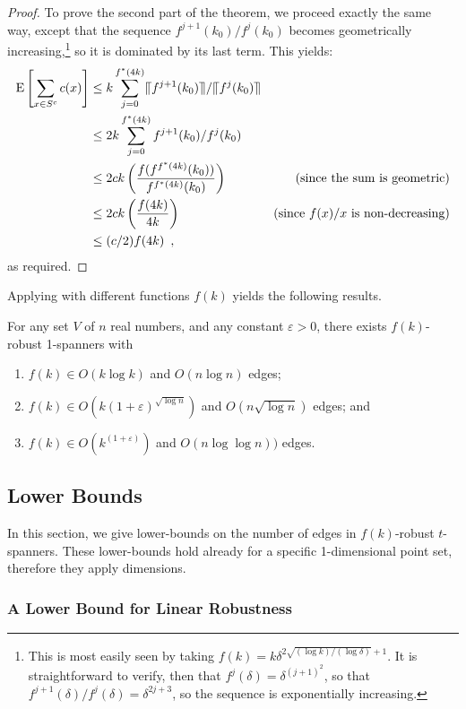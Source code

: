 \documentclass{patmorin}
\newcommand{\eps}{\varepsilon}
\begin{document}
\begin{proof}
  To prove the second part of the theorem, we proceed exactly the
  same way, except that the sequence $f^{j+1}(k_0)/f^j(k_0)$ becomes
  geometrically increasing,\footnote{This is most easily seen by
  taking $f(k) = k\delta^{2\sqrt{(\log k)/(\log\delta)}+1}$.  It is
  straightforward to verify, then that $f^j(\delta) = \delta^{(j+1)^2}$,
  so that $f^{j+1}(\delta)/f^j(\delta)= \delta^{2j+3}$, so the sequence
  is exponentially increasing.} so it is dominated by its last term.
  This yields:
  \begin{align*}
  \mathrm{E}\left[\sum_{x\in S^c} c(x)\right] 
      & \le  k \sum_{j=0}^{f^*(4k)} \llceil f^{j+1}(k_0)\rrceil/\llceil f^j(k_0)\rrceil \\
      & \le  2k \sum_{j=0}^{f^*(4k)} f^{j+1}(k_0)/f^j(k_0) \\
      & \le  2ck\left(\frac{f(f^{f^*(4k)}(k_0))}{f^{f^*(4k)}(k_0)}\right) 
            & \text{(since the sum is geometric)} \\
      & \le  2ck\left(\frac{f(4k)}{4k}\right) 
            & \text{(since $f(x)/x$ is non-decreasing)} \\
      & \le  (c/2)f(4k) \enspace ,
  \end{align*}
  as required.
\end{proof}


Applying  with different functions $f(k)$ yields the
following results.
\begin{cor}
  For any set $V$ of $n$ real numbers, and any constant $\eps >0$,
  there exists $f(k)$-robust 1-spanners with
  \begin{enumerate}
    \item $f(k)\in O(k\log k)$ and $O(n\log n)$ edges;
    \item $f(k)\in O(k(1+\eps)^{\sqrt{\log n}})$ and $O(n\sqrt{\log n})$
      edges; and
    \item $f(k)\in O(k^{(1+\eps)})$ and $O(n\log\log n))$ edges.
  \end{enumerate}
\end{cor}


\subsection{Lower Bounds}

In this section, we give lower-bounds on the number of edges in
$f(k)$-robust $t$-spanners.  These lower-bounds hold already for a
specific 1-dimensional point set, therefore they apply dimensions.

\subsubsection{A Lower Bound for Linear Robustness}
\end{document}
